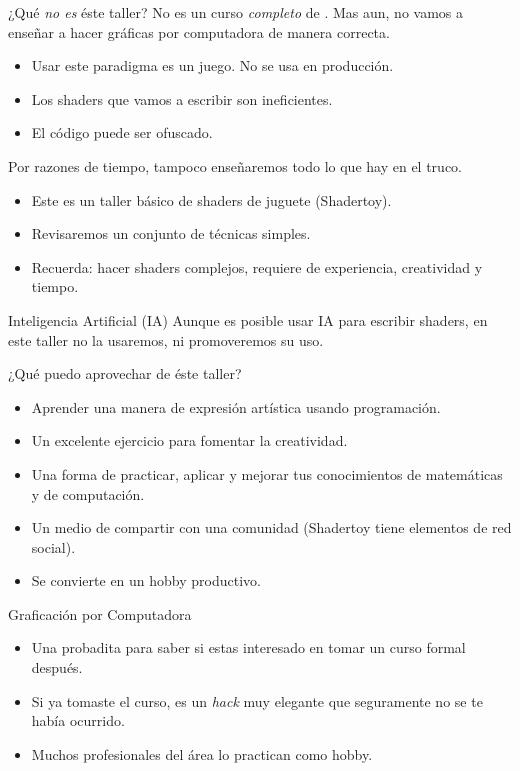 \begin{frame}{¿Qué \emph{no es} éste taller?}
    No es un curso \emph{completo} de .
    Mas aun, no vamos a enseñar a hacer gráficas por computadora de manera correcta.
    \begin{itemize}
         \item Usar este paradigma \alert{es un juego}. No se usa en producción.
         \item Los shaders que vamos a escribir son ineficientes.
         \item El código puede ser ofuscado.
     \end{itemize}
     Por razones de tiempo, tampoco enseñaremos todo lo que hay en el truco.
     \begin{itemize}
        \item Este es un taller \alert{básico} de shaders de juguete (Shadertoy).
        \item Revisaremos un conjunto de técnicas simples.
        \item Recuerda: hacer shaders complejos, requiere de experiencia, creatividad y tiempo.
    \end{itemize}
    \begin{block}{Inteligencia Artificial (IA)}
    	Aunque es posible usar IA para escribir shaders, en este taller no la usaremos, ni promoveremos su uso.
    \end{block}
\end{frame}

\begin{frame}{¿Qué puedo aprovechar de éste taller?}
    \begin{itemize}
         \item Aprender una manera de expresión artística usando programación.
         \item Un excelente ejercicio para fomentar la creatividad.
         \item Una forma de practicar, aplicar y mejorar tus conocimientos de matemáticas y de computación.
         \item Un medio de compartir con una comunidad (Shadertoy tiene elementos de red social).
         \item Se convierte en un hobby productivo.
     \end{itemize}
     
     \begin{block}{Graficación por Computadora}
         \begin{itemize}
            \item Una probadita para saber si estas interesado en tomar un curso formal después.
            \item Si ya tomaste el curso, es un \emph{hack} muy elegante que seguramente no se te había ocurrido.
            \item Muchos profesionales del área lo practican como hobby.
        \end{itemize}  
    \end{block}
\end{frame}

